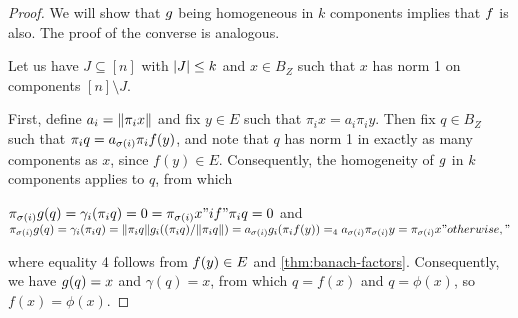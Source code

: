 \documentclass{amsart}
\theoremstyle{definition}
\begin{document}
\begin{proof} 

  We will show that $g$ being homogeneous in $k$ components implies that $f$ is also. The proof of the converse is analogous.

  Let us have $J \subseteq [n]$ with $\abs{J} \leq k$ and $x \in B_Z$ such that $x$ has norm 1 on components $[n] \setminus J$.

  First, define $a_i = \norm{\pi_i x}$ and fix $y \in E$ such that
  $\pi_i x = a_i \pi_i y$. Then fix $q \in B_Z$ such that $\pi_i q = a_{\sigma(i)} \pi_i f(y)$, and note that $q$ has norm 1 in exactly as many components as $x$, since $f(y) \in E$. Consequently, the homogeneity of $g$ in $k$ components applies to $q$, from which

  $ \pi_{\sigma(i)} g(q) = \gamma_i (\pi_i q) = 0 = \pi_{\sigma(i)} x "      if"
  \pi_i q = 0 $
  and
  $ \pi_{\sigma(i)} g(q) = \gamma_i (\pi_i q) = \norm{\pi_i q} g_i ((\pi_i q)/\norm{\pi_i q}) = a_{\sigma(i)} g_i (\pi_i f(y)) =_4 a_{\sigma(i)} \pi_{\sigma(i)} y = \pi_{\sigma(i)} x "    otherwise," $

  where equality 4 follows from $f(y) \in E$ and \autoref{thm:banach-factors}.
  Consequently, we have $g(q) = x$ and $\gamma(q) = x$, from which
  $q = f(x)$ and $q = \phi(x)$, so $f(x) = \phi(x)$.
\end{proof}
\end{document}
